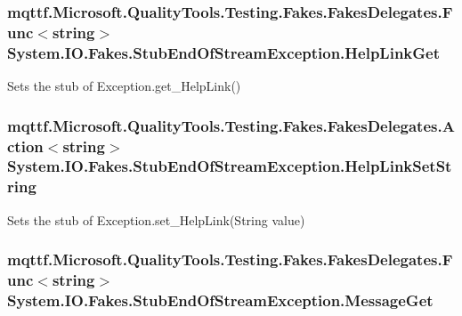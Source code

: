 \hypertarget{class_system_1_1_i_o_1_1_fakes_1_1_stub_end_of_stream_exception_a95d4982f45a4621f4b951122acada209}{
\subsubsection[{Help\-Link\-Get}]{\setlength{\rightskip}{0pt plus 5cm}mqttf.\-Microsoft.\-Quality\-Tools.\-Testing.\-Fakes.\-Fakes\-Delegates.\-Func$<$string$>$ System.\-I\-O.\-Fakes.\-Stub\-End\-Of\-Stream\-Exception.\-Help\-Link\-Get}}\label{class_system_1_1_i_o_1_1_fakes_1_1_stub_end_of_stream_exception_a95d4982f45a4621f4b951122acada209}


Sets the stub of Exception.\-get\-\_\-\-Help\-Link()

\hypertarget{class_system_1_1_i_o_1_1_fakes_1_1_stub_end_of_stream_exception_aa64658d7a53dcaf5f0b39029ab758811}{
\subsubsection[{Help\-Link\-Set\-String}]{\setlength{\rightskip}{0pt plus 5cm}mqttf.\-Microsoft.\-Quality\-Tools.\-Testing.\-Fakes.\-Fakes\-Delegates.\-Action$<$string$>$ System.\-I\-O.\-Fakes.\-Stub\-End\-Of\-Stream\-Exception.\-Help\-Link\-Set\-String}}\label{class_system_1_1_i_o_1_1_fakes_1_1_stub_end_of_stream_exception_aa64658d7a53dcaf5f0b39029ab758811}


Sets the stub of Exception.\-set\-\_\-\-Help\-Link(\-String value)

\hypertarget{class_system_1_1_i_o_1_1_fakes_1_1_stub_end_of_stream_exception_a65c3f35cd0be3f40edebbdb1c6fee713}{
\subsubsection[{Message\-Get}]{\setlength{\rightskip}{0pt plus 5cm}mqttf.\-Microsoft.\-Quality\-Tools.\-Testing.\-Fakes.\-Fakes\-Delegates.\-Func$<$string$>$ System.\-I\-O.\-Fakes.\-Stub\-End\-Of\-Stream\-Exception.\-Message\-Get}}\label{class_system_1_1_i_o_1_1_fakes_1_1_stub_end_of_stream_exception_a65c3f35cd0be3f40edebbdb1c6fee713}



